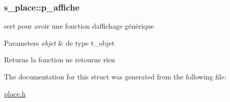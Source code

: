 \subsubsection[{\texorpdfstring{p\+\_\+affiche}{p_affiche}}]{\setlength{\rightskip}{0pt plus 5cm}s\+\_\+place\+::p\+\_\+affiche}\hypertarget{structs__place_a3876d28b2a22e373f0f820d723ef4dbd}{}\label{structs__place_a3876d28b2a22e373f0f820d723ef4dbd}


sert pour avoir une fonction d\textquotesingle{}affichage générique 


\begin{DoxyParams}{Parameters}
{\em objet} & de type t\+\_\+objet \\
\hline
\end{DoxyParams}
\begin{DoxyReturn}{Returns}
la fonction ne retourne rien 
\end{DoxyReturn}


The documentation for this struct was generated from the following file\+:\begin{DoxyCompactItemize}
\item 
\hyperlink{place_8h}{place.\+h}\end{DoxyCompactItemize}
